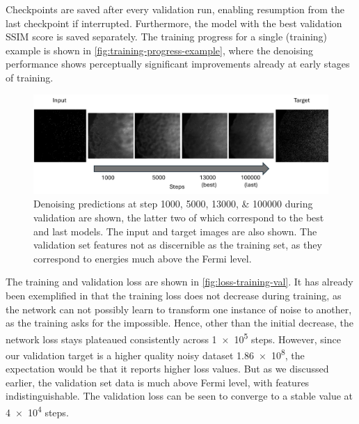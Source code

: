 Checkpoints are saved after every validation run, enabling resumption from the last checkpoint if interrupted. Furthermore, the model with the best validation \gls{SSIM} score is saved separately. The training progress for a single (training) example is shown in \cref{fig:training-progress-example}, where the denoising performance shows perceptually significant improvements already at early stages of training.



\begin{figure}
    \centering
    \includegraphics[width=1\linewidth]{images/val_over_time.pdf}
    \caption{Denoising predictions at step \numlist{1000;5000;13000;100000} during validation are shown, the latter two of which correspond to the best and last models. The input and target images are also shown. The validation set features not as discernible as the training set, as they correspond to energies much above the Fermi level.}
    \label{fig:val-progress-example}
\end{figure}

The training and validation loss are shown in \cref{fig:loss-training-val}. It has already been exemplified in \cite{lehtinenNoise2NoiseLearningImage2018} that the training loss does not decrease during training, as the network can not possibly learn to transform one instance of noise to another, as the training asks for the impossible. Hence, other than the initial decrease, the network loss stays plateaued consistently across \num{1e5} steps. However, since our validation target is a higher quality noisy dataset \num{1.86e8}, the expectation would be that it reports higher loss values. But as we discussed earlier, the validation set data is much above Fermi level, with features indistinguishable. The validation loss can be seen to converge to a stable value at \num{4e4} steps. 

